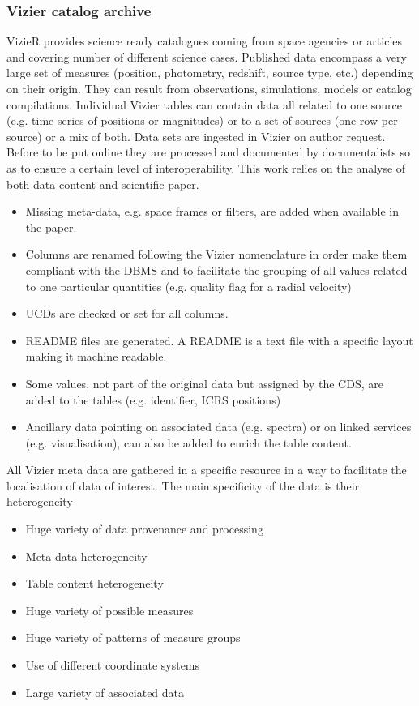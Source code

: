 \documentclass[11pt,a4paper]{ivoa}
\begin{document}
\subsubsection{Vizier catalog archive  }

%
VizieR provides science ready catalogues coming from space agencies or articles and covering number of different science cases. 
Published data encompass a very large set of measures (position, photometry, redshift, source type, etc.) depending on their origin. 
They can result from  observations, simulations, models or catalog compilations.
Individual Vizier tables can contain data all related to one source (e.g. time series of positions or magnitudes) or to a set of sources (one row per source) or a mix of both.  
%
Data sets are ingested in Vizier on author request. Before to be put online they are processed and documented by documentalists so as to ensure a certain level of interoperability.
This work relies on the analyse of both data content and scientific paper.
\begin{itemize}
\item Missing meta-data, e.g. space frames or filters, are added when available in the paper.
\item Columns are renamed following the Vizier nomenclature in order make them compliant with the DBMS and to facilitate the grouping of all values related to one particular quantities (e.g. quality flag for a radial velocity)
\item UCDs are checked or set for all columns.
\item README files are generated. A README is a text file with a specific layout making it machine readable.
\item Some values, not part of the original data but assigned by the CDS, are added to the tables (e.g. identifier, ICRS positions)  
\item Ancillary data pointing on associated data (e.g.  spectra) or on linked services (e.g. visualisation), can also be added to enrich the table content.  
\end{itemize}

All Vizier meta data are gathered in a specific resource in a way to facilitate the localisation of data of interest.
The main specificity of the data is their heterogeneity 
\begin{itemize}
\item Huge variety of data provenance and processing 
\item Meta data heterogeneity
\item Table content heterogeneity
\item Huge variety of possible measures
\item Huge variety of patterns of measure groups
\item Use of different coordinate systems 
\item Large variety of associated data
\end{itemize}
\end{document}
